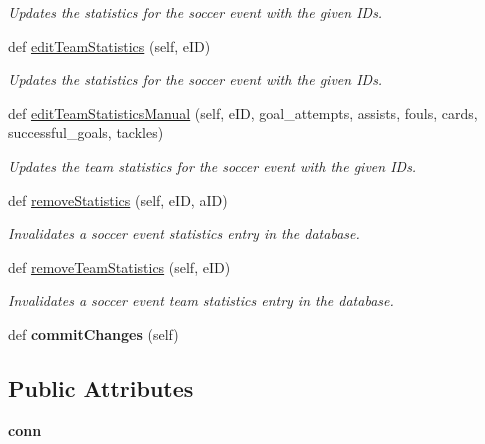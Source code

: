 \begin{DoxyCompactItemize}
\begin{DoxyCompactList}\small\item\em Updates the statistics for the soccer event with the given I\+Ds. \end{DoxyCompactList}\item 
def \hyperlink{classhandler_1_1dao_1_1soccer__event__dao_1_1_soccer_event_d_a_o_a27b8ccd06f79155891d27762f753113f}{edit\+Team\+Statistics} (self, e\+ID)
\begin{DoxyCompactList}\small\item\em Updates the statistics for the soccer event with the given I\+Ds. \end{DoxyCompactList}\item 
def \hyperlink{classhandler_1_1dao_1_1soccer__event__dao_1_1_soccer_event_d_a_o_a6562b7b676458565a51144139b7d6643}{edit\+Team\+Statistics\+Manual} (self, e\+ID, goal\+\_\+attempts, assists, fouls, cards, successful\+\_\+goals, tackles)
\begin{DoxyCompactList}\small\item\em Updates the team statistics for the soccer event with the given I\+Ds. \end{DoxyCompactList}\item 
def \hyperlink{classhandler_1_1dao_1_1soccer__event__dao_1_1_soccer_event_d_a_o_a72161d402ddb91ba5d2a500bfb96f48d}{remove\+Statistics} (self, e\+ID, a\+ID)
\begin{DoxyCompactList}\small\item\em Invalidates a soccer event statistics entry in the database. \end{DoxyCompactList}\item 
def \hyperlink{classhandler_1_1dao_1_1soccer__event__dao_1_1_soccer_event_d_a_o_ab5314993a7cd3d1ca3cd773826b5a1b1}{remove\+Team\+Statistics} (self, e\+ID)
\begin{DoxyCompactList}\small\item\em Invalidates a soccer event team statistics entry in the database. \end{DoxyCompactList}\item 
\mbox{\label{classhandler_1_1dao_1_1soccer__event__dao_1_1_soccer_event_d_a_o_a706061250b664f015bd6c832d653923f}} 
def {\bfseries commit\+Changes} (self)
\end{DoxyCompactItemize}
\subsection*{Public Attributes}
\begin{DoxyCompactItemize}
\item 
\mbox{\label{classhandler_1_1dao_1_1soccer__event__dao_1_1_soccer_event_d_a_o_aa27075666265b6b825d098518494bc85}} 
{\bfseries conn}
\end{DoxyCompactItemize}


